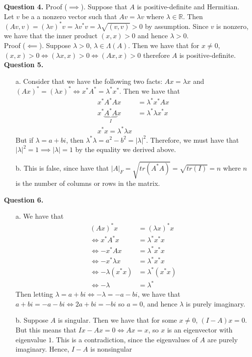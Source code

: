 \documentclass{article}
\newcommand{\R}{\mathbb{R}}
\begin{document}
\textbf{Question 4.} Proof ($\implies$). Suppose that $A$ is positive-definite and Hermitian. Let $v$ be a a nonzero vector such that $Av = \lambda v$ where $\lambda \in \R$. Then $(Av, v) = (\lambda v)^* v = \lambda v^*v = \lambda \sqrt{(v,v)} > 0$ by assumption. Since $v$ is nonzero, we have that the inner product $(x,x) > 0$ and hence $\lambda > 0$. \\

Proof ($\impliedby$). Suppose $\lambda > 0$, $\lambda \in \Lambda(A)$. Then we have that for $x\neq 0$, $(x, x) > 0 \iff (\lambda x, x) >0\iff (Ax, x) > 0$ therefore $A$ is positive-definite.\\

\textbf{Question 5.} 
\begin{itemize}
    \item[a.] Consider that we have the following two facts: $Ax =\lambda x$ and $(Ax)^*=\left(\lambda x\right)^* \iff x^*A^*=\lambda^* x^*$. Then we have that
    \begin{align*}
        x^* A^* A x &= \lambda^* x^* Ax \\
        x^* \underbrace{A^* A}_{I} x &= \lambda^* \lambda x^* x\\
        x^* x= \lambda^* \lambda x 
    \end{align*} 
    But if $\lambda = a+bi$, then $\lambda^*\lambda = a^2-b^2 = \left| \lambda\right|^2$. Therefore, we must have that $\left| \lambda\right|^2 = 1\implies |\lambda | = 1$ by the equality we derived above. 
    \item[b.] This is false, since have that $\left| A\right|_F = \sqrt{tr(A^*A)} = \sqrt{tr(I)} = n$ where $n$ is the number of columns or rows in the matrix. 
\end{itemize}

\textbf{Question 6.} 
\begin{itemize}
    \item[a.] We have that 
    \begin{align*}
        (Ax)^*x &= (\lambda x)^* x \\
        \iff x^* A^* x &= \lambda^* x^* x\\
        \iff -x^*Ax &= \lambda^*x^*x\\
        \iff -x^*\lambda x &= \lambda^* x^* x \\
        \iff -\lambda (x^*x) &= \lambda^* (x^*x)\\
        \iff -\lambda &= \lambda^*
    \end{align*} 
    Then letting $\lambda = a+bi \iff -\lambda = -a-bi$, we have that $a+bi = -a-bi \iff 2a + bi = -bi$ so $a=0$, and hence $\lambda$ is purely imaginary.
    \item[b.] Suppose $A$ is singular. Then we have that for some $x \neq 0$, $(I-A)x=0$. But this means that $Ix-Ax = 0 \iff Ax = x$, so $x$ is an eigenvector with eigenvalue $1$. This is a contradiction, since the eigenvalues of $A$ are purely imaginary. Hence, $I-A$ is nonsingular
\end{itemize}
\end{document}

